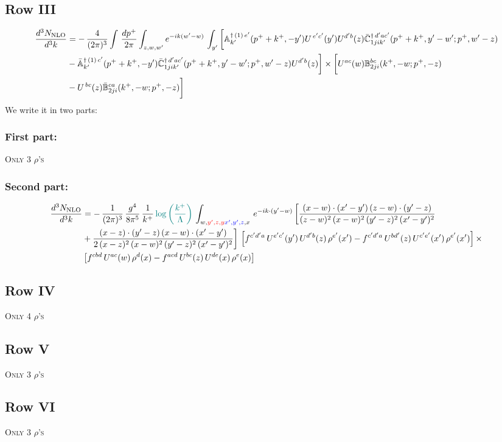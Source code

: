 \documentclass[9pt]{article}
\def\mf#1{\mathbb{#1}}
\numberwithin{equation}{section}
\begin{document}
 \subsection{Row III}
 \begin{align}
    \frac{d^{3}N_{\rm NLO}}{d^{3}k} & =   -\,\frac{4}{(2\pi)^{3}} \int\, \frac{dp^{+}}{2\pi}\int_{z,w,w^{\prime}} e^{-ik(w^{\prime}-w)}\,\int_{y^{\prime}}\bigg[\mf{A}^{\dagger\, (1)\,e^{\prime}}_{k^{\prime}}(p^{+}+k^{+},-y^{\prime})U^{\, e^{\prime}c^{\prime}}(y^{\prime})U^{d^{\prime}b}(z) \Bar{\mf{C}}^{\dagger\, d^{\prime}ac^{\prime}}_{1jik^{\prime}}(p^{+}+k^{+},y^{\prime}-w^{\prime}; p^{+},w^{\prime}-z)\notag \\ &  -\Bar{\mf{A}}^{\dagger\, (1)\,c^{\prime}}_{k^{\prime}}(p^{+}+k^{+},-y^{\prime}) \Bar{\mf{C}}^{\dagger\, d^{\prime}ac^{\prime}}_{1jik^{\prime}}(p^{+}+k^{+},y^{\prime}-w^{\prime}; p^{+},w^{\prime}-z)U^{d^{\prime}b}(z)\bigg] \times \bigg[U^{ac}(w) \mf{B}^{bc}_{2ji}(k^{+},-w;p^{+},-z)\notag \\ &  -U^{\, bc}(z)\Bar{\mf{B}}^{ca}_{2ji}(k^{+},-w; p^{+},-z)\bigg]\nonumber
\end{align}
We write it in two parts:
\subsubsection{First part:}
\textsc{Only 3 $\rho$'s}
\subsubsection{Second part:}
\begin{align}
 \frac{d^{3}N_{\rm NLO}}{d^{3}k} & =  -\, \frac{1}{(2\pi)^{3}}\,\frac{g^{4}}{8\pi^{5}}\,\frac{1}{k^{+}}\,{\color{teal}\log{\left(\frac{k^{+}}{\Lambda}\right)}}\,\int_{w,{\color{red}y',z,y}{\color{blue}x',y',z},x}\, e^{-ik\cdot (y'-w)}\,\bigg[\frac{(x-w)\cdot (x'-y')\,(z-w)\cdot (y'-z)}{(z-w)^{2}\,(x-w)^{2}\,(y'-z)^{2}\,(x'-y')^{2}}\notag \\ & +\frac{(x-z)\cdot (y'-z)\,(x-w)\cdot (x'-y')}{2\,(x-z)^{2}\,(x-w)^{2}\,(y'-z)^{2}\,(x'-y')^{2}}\bigg]\, \left[f^{c'd'a}\,U^{e'c'}(y')\,U^{d'b}(z)\,\rho^{e'}(x')-f^{c'd'a}\, 
    U^{bd'}(z)\,U^{c'e'}(x')\,\rho^{e'}(x')\right]\times\notag \\ &  \left[f^{cbd}\,U^{ac}(w)\,\rho^{d}(x) -f^{acd}\,U^{bc}(z)\,U^{de}(x)\,\rho^{e}(x)\right] 
\end{align}
\subsection{Row IV}
\textsc{Only 4 $\rho$'s}
\subsection{Row V}
\textsc{Only 3 $\rho$'s}
\subsection{Row VI}
\textsc{Only 3 $\rho$'s}
\end{document}
